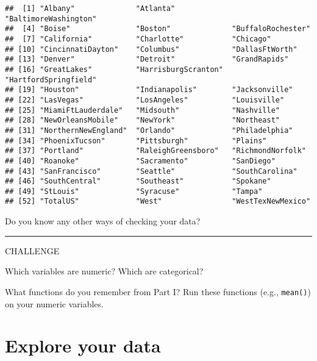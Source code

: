 \documentclass[]{book}
\newenvironment{Shaded}{\begin{snugshade}}{\end{snugshade}}
\newcommand{\KeywordTok}[1]{\textcolor[rgb]{0.13,0.29,0.53}{\textbf{#1}}}
\newcommand{\NormalTok}[1]{#1}
\newcommand{\OperatorTok}[1]{\textcolor[rgb]{0.81,0.36,0.00}{\textbf{#1}}}
\begin{document}
\begin{Shaded}
\end{Shaded}

\begin{verbatim}
##  [1] "Albany"              "Atlanta"             "BaltimoreWashington"
##  [4] "Boise"               "Boston"              "BuffaloRochester"   
##  [7] "California"          "Charlotte"           "Chicago"            
## [10] "CincinnatiDayton"    "Columbus"            "DallasFtWorth"      
## [13] "Denver"              "Detroit"             "GrandRapids"        
## [16] "GreatLakes"          "HarrisburgScranton"  "HartfordSpringfield"
## [19] "Houston"             "Indianapolis"        "Jacksonville"       
## [22] "LasVegas"            "LosAngeles"          "Louisville"         
## [25] "MiamiFtLauderdale"   "Midsouth"            "Nashville"          
## [28] "NewOrleansMobile"    "NewYork"             "Northeast"          
## [31] "NorthernNewEngland"  "Orlando"             "Philadelphia"       
## [34] "PhoenixTucson"       "Pittsburgh"          "Plains"             
## [37] "Portland"            "RaleighGreensboro"   "RichmondNorfolk"    
## [40] "Roanoke"             "Sacramento"          "SanDiego"           
## [43] "SanFrancisco"        "Seattle"             "SouthCarolina"      
## [46] "SouthCentral"        "Southeast"           "Spokane"            
## [49] "StLouis"             "Syracuse"            "Tampa"              
## [52] "TotalUS"             "West"                "WestTexNewMexico"
\end{verbatim}

\leavevmode\hypertarget{question}{}%
Do you know any other ways of checking your data?

\begin{center}\rule{0.5\linewidth}{0.5pt}\end{center}

\leavevmode\hypertarget{challenge}{}%
CHALLENGE

Which variables are numeric? Which are categorical?

What functions do you remember from Part I? Run these functions (e.g., \texttt{mean()}) on your numeric variables.

\hypertarget{explore-your-data}{%
\section{Explore your data}\label{explore-your-data}}
\end{document}
